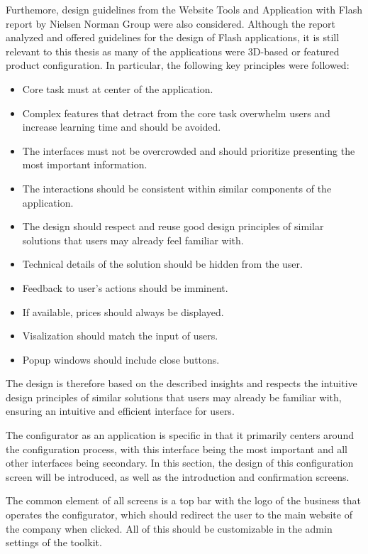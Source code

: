 Furthemore, design guidelines from the Website Tools and Application with Flash report by Nielsen Norman Group \cite{Nielsen2013} were also considered. Although the report analyzed and offered guidelines for the design of Flash applications, it is still relevant to this thesis as many of the applications were 3D-based or featured product configuration. In particular, the following key principles were followed:
\begin{itemize}[label=\rectanglebullet]
    \item Core task must at center of the application.
    \item Complex features that detract from the core task overwhelm users and increase learning time and should be avoided.
    \item The interfaces must not be overcrowded and should prioritize presenting the most important information.
    \item The interactions should be consistent within similar components of the application.
    \item The design should respect and reuse good design principles of similar solutions that users may already feel familiar with.
    \item Technical details of the solution should be hidden from the user.
    \item Feedback to user's actions should be imminent.
    \item If available, prices should always be displayed.
    \item Visalization should match the input of users.
    \item Popup windows should include close buttons.
\end{itemize}

The design is therefore based on the described insights and respects the intuitive design principles of similar solutions that users may already be familiar with, ensuring an intuitive and efficient interface for users.

The configurator as an application is specific in that it primarily centers around the configuration process, with this interface being the most important and all other interfaces being secondary. In this section, the design of this configuration screen will be introduced, as well as the introduction and confirmation screens.

The common element of all screens is a top bar with the logo of the business that operates the configurator, which should redirect the user to the main website of the company when clicked. All of this should be customizable in the admin settings of the toolkit.

